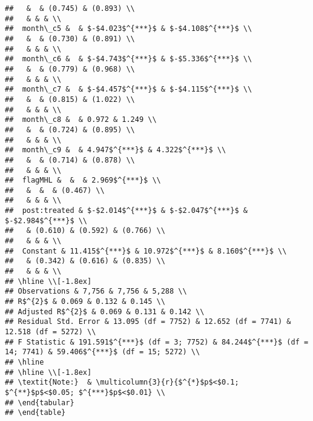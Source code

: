 \documentclass[11pt,]{article}
\begin{document}
\begin{verbatim}
##   &  & (0.745) & (0.893) \\ 
##   & & & \\ 
##  month\_c5 &  & $-$4.023$^{***}$ & $-$4.108$^{***}$ \\ 
##   &  & (0.730) & (0.891) \\ 
##   & & & \\ 
##  month\_c6 &  & $-$4.743$^{***}$ & $-$5.336$^{***}$ \\ 
##   &  & (0.779) & (0.968) \\ 
##   & & & \\ 
##  month\_c7 &  & $-$4.457$^{***}$ & $-$4.115$^{***}$ \\ 
##   &  & (0.815) & (1.022) \\ 
##   & & & \\ 
##  month\_c8 &  & 0.972 & 1.249 \\ 
##   &  & (0.724) & (0.895) \\ 
##   & & & \\ 
##  month\_c9 &  & 4.947$^{***}$ & 4.322$^{***}$ \\ 
##   &  & (0.714) & (0.878) \\ 
##   & & & \\ 
##  flagMHL &  &  & 2.969$^{***}$ \\ 
##   &  &  & (0.467) \\ 
##   & & & \\ 
##  post:treated & $-$2.014$^{***}$ & $-$2.047$^{***}$ & $-$2.984$^{***}$ \\ 
##   & (0.610) & (0.592) & (0.766) \\ 
##   & & & \\ 
##  Constant & 11.415$^{***}$ & 10.972$^{***}$ & 8.160$^{***}$ \\ 
##   & (0.342) & (0.616) & (0.835) \\ 
##   & & & \\ 
## \hline \\[-1.8ex] 
## Observations & 7,756 & 7,756 & 5,288 \\ 
## R$^{2}$ & 0.069 & 0.132 & 0.145 \\ 
## Adjusted R$^{2}$ & 0.069 & 0.131 & 0.142 \\ 
## Residual Std. Error & 13.095 (df = 7752) & 12.652 (df = 7741) & 12.518 (df = 5272) \\ 
## F Statistic & 191.591$^{***}$ (df = 3; 7752) & 84.244$^{***}$ (df = 14; 7741) & 59.406$^{***}$ (df = 15; 5272) \\ 
## \hline 
## \hline \\[-1.8ex] 
## \textit{Note:}  & \multicolumn{3}{r}{$^{*}$p$<$0.1; $^{**}$p$<$0.05; $^{***}$p$<$0.01} \\ 
## \end{tabular} 
## \end{table}
\end{verbatim}
\end{document}
